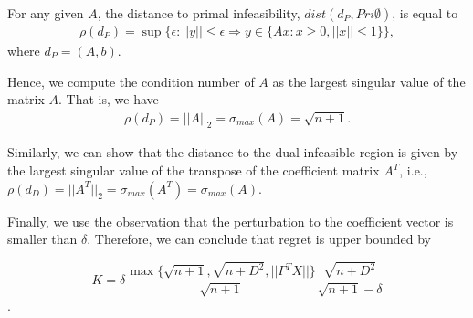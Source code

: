 \documentclass[11pt,a4paper]{article}
\begin{document}
\begin{lem}
For any given $A$, the distance to primal infeasibility, $dist(d_P, Pri\emptyset)$, is equal to
\begin{align*}
\rho(d_P) = \sup \{ \epsilon : ||y|| \leq \epsilon \Rightarrow y \in \{ Ax: x \geq 0, ||x|| \leq 1 \}  \},
\end{align*}
where $d_P = (A, b)$.
\end{lem}

Hence, we compute the condition number of $A$ as the largest singular value of the matrix $A$. That is, we have
\begin{align*}
\rho(d_P) = || A ||_2 = \sigma_{max} (A) = \sqrt{n+1}.
\end{align*}

Similarly, we can show that the distance to the dual infeasible region is given by the largest singular value of the transpose of the coefficient matrix $A^T$, i.e., $\rho(d_D) = || A^T ||_2 =  \sigma_{max} (A^T) = \sigma_{max} (A) $.

Finally, we use the observation that the perturbation to the coefficient vector is smaller than $\delta$. Therefore, we can conclude that regret is upper bounded by

$$ K = \delta \frac{ \max \{ \sqrt{n+1}, \sqrt{n+D^2}, || \Gamma^T X || \} }{ \sqrt{n+1} } \frac{ \sqrt{n+D^2} }{\sqrt{n+1} - \delta } $$.
\end{document}

